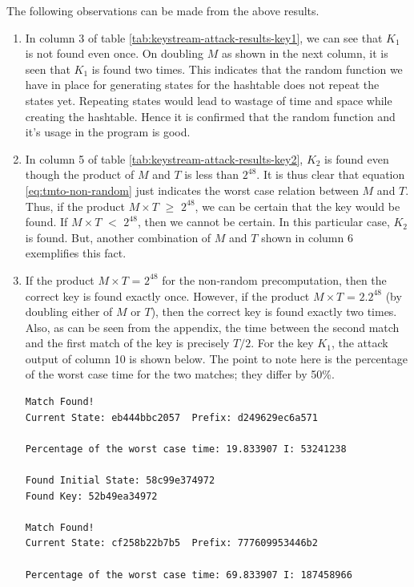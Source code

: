 The following observations can be made from the above results. 
\begin{enumerate}
\item In column 3 of table \ref{tab:keystream-attack-results-key1}, we can see that $K_1$ is not found even once. On doubling $M$ as shown in the next column, it is seen that $K_1$ is found two times. This indicates that the random function we have in place for generating states for the hashtable does not repeat the states yet. Repeating states would lead to wastage of time and space while creating the hashtable. Hence it is confirmed that the random function and it's usage in the program is good.

\item In column 5 of table \ref{tab:keystream-attack-results-key2}, $K_2$ is found even though the product of $M$ and $T$ is less than $2^{48}$. It is thus clear that equation \ref{eq:tmto-non-random} just indicates the worst case relation between $M$ and $T$. Thus, if the product $M \times T$ $\geq$ $2^{48}$, we can be certain that the key would be found. If $M \times T$ $<$ $2^{48}$, then we cannot be certain. In this particular case, $K_2$ is found. But, another combination of $M$ and $T$ shown in column 6 exemplifies this fact.

\item If the product $M \times T$ = $2^{48}$ for the non-random precomputation, then the correct key is found exactly once. However, if the product $M \times T$ = $2.2^{48}$ (by doubling either of $M$ or $T$), then the correct key is found exactly two times. Also, as can be seen from the appendix, the time between the second match and the first match of the key is precisely $T/2$. For the key $K_1$, the attack output of column 10 is shown below. The point to note here is the percentage of the worst case time for the two matches; they differ by 50\%. 


\begin{lstlisting}[frame=tb]
Match Found! 
Current State: eb444bbc2057  Prefix: d249629ec6a571

Percentage of the worst case time: 19.833907 I: 53241238

Found Initial State: 58c99e374972
Found Key: 52b49ea34972

Match Found! 
Current State: cf258b22b7b5  Prefix: 777609953446b2

Percentage of the worst case time: 69.833907 I: 187458966


\end{lstlisting}
\end{enumerate}
